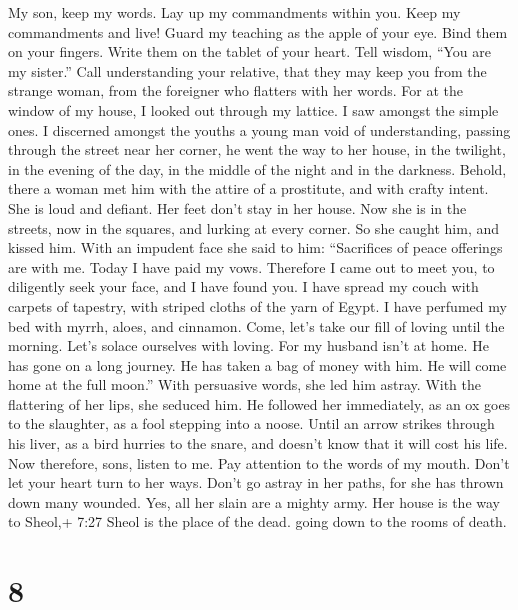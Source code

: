  My son, keep my words. Lay up my commandments within you.
 Keep my commandments and live! Guard my teaching as the
apple of your eye.  Bind them on your fingers. Write them on
the tablet of your heart.  Tell wisdom, ``You are my
sister.'' Call understanding your relative,  that they may
keep you from the strange woman, from the foreigner who flatters with
her words.  For at the window of my house, I looked out
through my lattice.  I saw amongst the simple ones. I
discerned amongst the youths a young man void of understanding,
 passing through the street near her corner, he went the way
to her house,  in the twilight, in the evening of the day,
in the middle of the night and in the darkness.  Behold,
there a woman met him with the attire of a prostitute, and with crafty
intent.  She is loud and defiant. Her feet don't stay in
her house.  Now she is in the streets, now in the squares,
and lurking at every corner.  So she caught him, and kissed
him. With an impudent face she said to him:  ``Sacrifices
of peace offerings are with me. Today I have paid my vows. 
Therefore I came out to meet you, to diligently seek your face, and I
have found you.  I have spread my couch with carpets of
tapestry, with striped cloths of the yarn of Egypt.  I have
perfumed my bed with myrrh, aloes, and cinnamon.  Come,
let's take our fill of loving until the morning. Let's solace ourselves
with loving.  For my husband isn't at home. He has gone on
a long journey.  He has taken a bag of money with him. He
will come home at the full moon.''  With persuasive words,
she led him astray. With the flattering of her lips, she seduced him.
 He followed her immediately, as an ox goes to the
slaughter, as a fool stepping into a noose.  Until an arrow
strikes through his liver, as a bird hurries to the snare, and doesn't
know that it will cost his life.  Now therefore, sons,
listen to me. Pay attention to the words of my mouth. 
Don't let your heart turn to her ways. Don't go astray in her paths,
 for she has thrown down many wounded. Yes, all her slain
are a mighty army.  Her house is the way to Sheol,+ 7:27
Sheol is the place of the dead. going down to the rooms of death.

\hypertarget{section-7}{%
\section{8}\label{section-7}}

